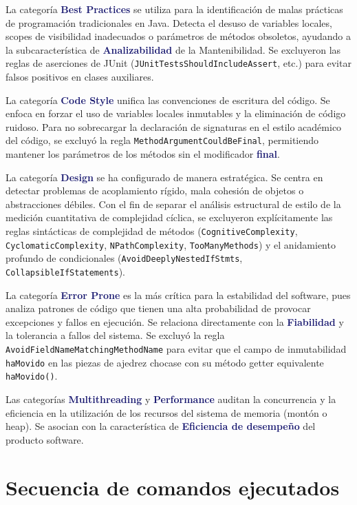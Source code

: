 \documentclass[12pt,a4paper]{article}
\newcommand{\key}[1]{\textbf{\textcolor{MidnightBlue}{#1}}}
\begin{document}
La categoría \key{Best Practices} se utiliza para la identificación de malas prácticas de programación tradicionales en Java. Detecta el desuso de variables locales, scopes de visibilidad inadecuados o parámetros de métodos obsoletos, ayudando a la subcaracterística de \key{Analizabilidad} de la Mantenibilidad. Se excluyeron las reglas de aserciones de JUnit (\texttt{JUnitTestsShouldIncludeAssert}, etc.) para evitar falsos positivos en clases auxiliares.

La categoría \key{Code Style} unifica las convenciones de escritura del código. Se enfoca en forzar el uso de variables locales inmutables y la eliminación de código ruidoso. Para no sobrecargar la declaración de signaturas en el estilo académico del código, se excluyó la regla \texttt{MethodArgumentCouldBeFinal}, permitiendo mantener los parámetros de los métodos sin el modificador \key{final}.

La categoría \key{Design} se ha configurado de manera estratégica. Se centra en detectar problemas de acoplamiento rígido, mala cohesión de objetos o abstracciones débiles. Con el fin de separar el análisis estructural de estilo de la medición cuantitativa de complejidad cíclica, se excluyeron explícitamente las reglas sintácticas de complejidad de métodos (\texttt{CognitiveComplexity}, \texttt{CyclomaticComplexity}, \texttt{NPathComplexity}, \texttt{TooManyMethods}) y el anidamiento profundo de condicionales (\texttt{AvoidDeeplyNestedIfStmts}, \texttt{CollapsibleIfStatements}).

La categoría \key{Error Prone} es la más crítica para la estabilidad del software, pues analiza patrones de código que tienen una alta probabilidad de provocar excepciones y fallos en ejecución. Se relaciona directamente con la \key{Fiabilidad} y la tolerancia a fallos del sistema. Se excluyó la regla \texttt{AvoidFieldNameMatchingMethodName} para evitar que el campo de inmutabilidad \texttt{haMovido} en las piezas de ajedrez chocase con su método getter equivalente \texttt{haMovido()}.

Las categorías \key{Multithreading} y \key{Performance} auditan la concurrencia y la eficiencia en la utilización de los recursos del sistema de memoria (montón o heap). Se asocian con la característica de \key{Eficiencia de desempeño} del producto software.

\section{Secuencia de comandos ejecutados}
\end{document}
